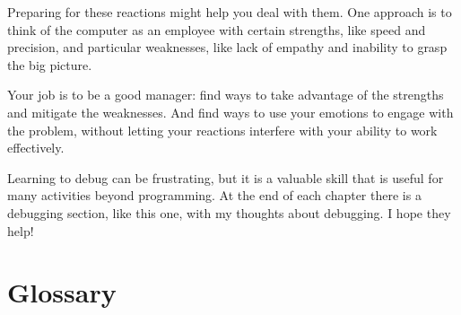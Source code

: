 \documentclass[10pt]{book}
\begin{document}
Preparing for these reactions might help you deal with them.
One approach is to think of the computer as an employee with
certain strengths, like speed and precision, and
particular weaknesses, like lack of empathy and inability
to grasp the big picture.

Your job is to be a good manager: find ways to take advantage
of the strengths and mitigate the weaknesses.  And find ways
to use your emotions to engage with the problem,
without letting your reactions interfere with your ability
to work effectively.

Learning to debug can be frustrating, but it is a valuable skill
that is useful for many activities beyond programming.  At the
end of each chapter there is a debugging section, like this one,
with my thoughts about debugging.  I hope they help!


\section{Glossary}
\end{document}
